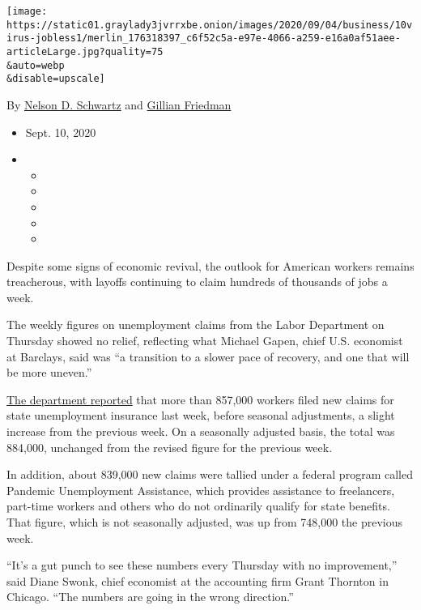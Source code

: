 \texttt{[image: https://static01.graylady3jvrrxbe.onion/images/2020/09/04/business/10virus-jobless1/merlin\_176318397\_c6f52c5a-e97e-4066-a259-e16a0af51aee-articleLarge.jpg?quality=75\\\&auto=webp\\\&disable=upscale]}

By \href{https://www.nytimes3xbfgragh.onion/by/nelson-d-schwartz}{Nelson
D. Schwartz} and
\href{http://nytimes3xbfgragh.onion/by/gillian-friedman}{Gillian
Friedman}

\begin{itemize}
\item
  Sept. 10, 2020
\item
  \begin{itemize}
  \item
  \item
  \item
  \item
  \item
  \end{itemize}
\end{itemize}

Despite some signs of economic revival, the outlook for American workers
remains treacherous, with layoffs continuing to claim hundreds of
thousands of jobs a week.

The weekly figures on unemployment claims from the Labor Department on
Thursday showed no relief, reflecting what Michael Gapen, chief U.S.
economist at Barclays, said was ``a transition to a slower pace of
recovery, and one that will be more uneven.''

\href{https://www.dol.gov/sites/dolgov/files/OPA/newsreleases/ui-claims/20201709.pdf}{The
department reported} that more than 857,000 workers filed new claims for
state unemployment insurance last week, before seasonal adjustments, a
slight increase from the previous week. On a seasonally adjusted basis,
the total was 884,000, unchanged from the revised figure for the
previous week.

In addition, about 839,000 new claims were tallied under a federal
program called Pandemic Unemployment Assistance, which provides
assistance to freelancers, part-time workers and others who do not
ordinarily qualify for state benefits. That figure, which is not
seasonally adjusted, was up from 748,000 the previous week.

``It's a gut punch to see these numbers every Thursday with no
improvement,'' said Diane Swonk, chief economist at the accounting firm
Grant Thornton in Chicago. ``The numbers are going in the wrong
direction.''

